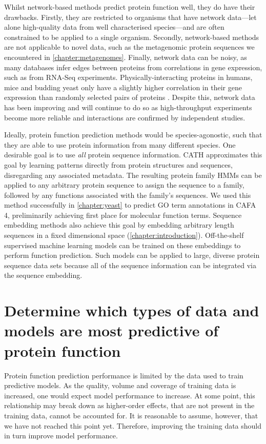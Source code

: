Whilst network-based methods predict protein function well, they do have their drawbacks. Firstly, they are restricted to organisms that have network data---let alone high-quality data from well characterised species---and are often constrained to be applied to a single organism. Secondly, network-based methods are not applicable to novel data, such as the metagenomic protein sequences we encountered in \ref{chapter:metagenomes}.
Finally, network data can be noisy, as many databases infer edges between proteins from correlations in gene expression, such as from RNA-Seq experiments.
Physically-interacting proteins in humans, mice and budding yeast only have a slightly higher correlation in their gene expression than randomly selected pairs of proteins \cite{Bhardwaj2005}.
Despite this, network data has been improving and will continue to do so as high-throughput experiments become more reliable and interactions are confirmed by independent studies.

Ideally, protein function prediction methods would be species-agonostic, such that they are able to use protein information from many different species. One desirable goal is to use \emph{all} protein sequence information. CATH approximates this goal by learning patterns directly from protein structures and sequences, disregarding any associated metadata. The resulting protein family HMMs can be applied to any arbitrary protein sequence to assign the sequence to a family, followed by any functions associated with the family's sequences. We used this method successfully in \ref{chapter:yeast} to predict GO term annotations in CAFA 4, preliminarily achieving first place for molecular function terms. Sequence embedding methods also achieve this goal by embedding arbitrary length sequences in a fixed dimensional space (\ref{chapter:introduction}). Off-the-shelf supervised machine learning models can be trained on these embeddings to perform function prediction. Such models can be applied to large, diverse protein sequence data sets because all of the sequence information can be integrated via the sequence embedding.

\section{Determine which types of data and models are most predictive of protein function}

Protein function prediction performance is limited by the data used to train predictive models. As the quality, volume and coverage of training data is increased, one would expect model performance to increase. At some point, this relationship may break down as higher-order effects, that are not present in the training data, cannot be accounted for. It is reasonable to assume, however, that we have not reached this point yet. Therefore, improving the training data should in turn improve model performance.

